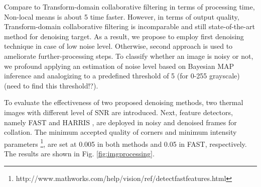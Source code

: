 Compare to Transform-domain collaborative filtering in terms of processing time, Non-local means is about 5 time faster. However, in terms of output quality, Transform-domain collaborative filtering is incomparable and still state-of-the-art method for denoising target. As a result, we propose to employ first denoising technique in case of low noise level. Otherwise, second approach is used to ameliorate further-processing steps. To classify whether an image is noisy or not, we profound applying an estimation of noise level based on Bayesian MAP inference \cite{liu2006noise} and analogizing to a predefined threshold of 5 (for 0-255 grayscale) (need to find this threshold!?).

To evaluate the effectiveness of two proposed denoising methods, two thermal images with different level of SNR are introduced. Next, feature detectors, namely FAST \cite{rosten2006machine} and HARRIS \cite{harris1988combined}, are deployed in noisy and denoised frames for collation. The  minimum accepted quality of corners and minimum intensity parameters \footnote{http://www.mathworks.com/help/vision/ref/detectfastfeatures.html}, are set at 0.005 in both methods and 0.05 in FAST, respectively.  The results are shown in Fig. \ref{fig:imgprocessing}.

